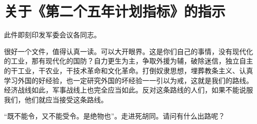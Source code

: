 \section[关于《第二个五年计划指标》的指示（一九五八年六月十七日）]{关于《第二个五年计划指标》的指示}


此件即刻印发军委会议各同志。

很好一个文件，值得认真一读。可以大开眼界。这是你们自己的事情，没有现代化的工业，那有现代化的国防？自力更生为主，争取外援为辅，破除迷信，独立自主的干工业，干农业，干技术革命和文化革命。打倒奴隶思想，埋葬教条主义、认真学习外国的好经验，也一定研究外国的坏经验一一引以为戒，这就是我们的路线。经济战线如此，军事战线上也完全应当如此。反对这条路线的人们，如果不能说服我们，他们就应当接受这条路线。

“既不能令，又不能受令。是绝物也”。走进死胡同。请问有什么出路呢？


